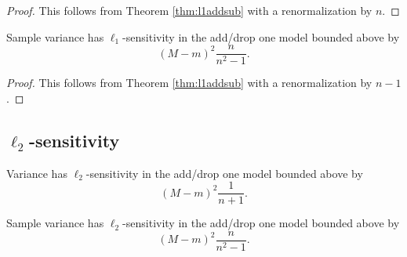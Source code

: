 \documentclass[11pt]{scrartcl} %
\begin{document}
 \begin{proof}
This follows from Theorem \ref{thm:l1addsub} with a renormalization by $n$.
\end{proof}

 \begin{corollary}
 \label{cor:l1addsub}
	Sample variance has $\ell_1$-sensitivity in the add/drop one model bounded above by
	$$\left( M-m \right)^2 \frac{n}{n^2 - 1}. $$
 \end{corollary}
 
 \begin{proof}
This follows from Theorem \ref{thm:l1addsub} with a renormalization by $n-1$.
\end{proof}

\subsection{$\ell_2$-sensitivity}

\begin{theorem}
\label{thm:l2addsub}
Variance has $\ell_2$-sensitivity in the add/drop one model bounded above by
	$$ \left( M-m \right)^2 \frac{1}{n+1} .$$
\end{theorem}


\begin{corollary}
Sample variance has $\ell_2$-sensitivity in the add/drop one model bounded above by
	$$ \left( M-m \right)^2 \frac{n}{n^2 - 1}.$$
\end{corollary}




\end{document}
